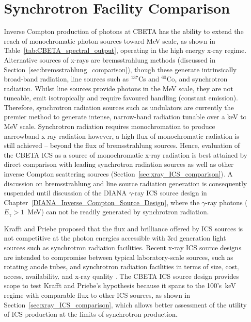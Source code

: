 \documentclass[../main.tex]{subfiles}
\begin{document}
\section{Synchrotron Facility Comparison}
\label{sec:synchrotron_facility_comparison}

Inverse Compton production of photons at CBETA has the ability to extend the reach of monochromatic photon sources toward \si{\mega\electronvolt} scale, as shown in Table~\ref{tab:CBETA_spectral_output}, operating in the high energy x-ray regime. Alternative sources of x-rays are bremsstrahlung methods (discussed in Section~\ref{sec:bremsstrahlung_comparison}), though these generate intrinsically broad-band radiation, line sources such as $^{137}$Cs and $^{60}$Co, and synchrotron radiation. Whilst line sources provide photons in the \si{\mega\electronvolt} scale, they are not tuneable, emit isotropically and require favoured handling (constant emission). Therefore, synchrotron radiation sources such as undulators are currently the premier method to generate intense, narrow-band radiation tunable over a \si{\kilo\electronvolt} to \si{\mega\electronvolt} scale. Synchrotron radiation requires monochromation to produce narrowband x-ray radiation \cite{caciuffo1987monochromators} however, a high flux of monochromatic radiation is still achieved -- beyond the flux of bremsstrahlung sources. Hence, evaluation of the CBETA ICS as a source of monochromatic x-ray radiation is best attained by direct comparison with leading synchrotron radiation sources as well as other inverse Compton scattering sources (Section~\ref{sec:xray_ICS_comparison}). A discussion on bremsstrahlung and line source radiation generation is consequently suspended until discussion of the DIANA $\gamma$-ray ICS source design in Chapter~\ref{DIANA_Inverse_Compton_Source_Design}, where the $\gamma$-ray photons ($E_{\gamma} > 1$~\si{\mega\electronvolt}) can not be readily generated by synchrotron radiation.   

Krafft and Priebe \cite{krafft2010compton} proposed that the flux and brilliance offered by ICS sources is not competitive at the photon energies accessible with 3rd generation light sources such as synchrotron radiation facilities. Recent x-ray ICS source designs are intended to compromise between typical laboratory-scale sources, such as rotating anode tubes, and synchrotron radiation facilities in terms of size, cost, access, availability, and x-ray quality \cite{deitrick2018high}. The CBETA ICS source design provides scope to test Krafft and Priebe's hypothesis because it spans to the 100's~\si{\kilo\electronvolt} regime with comparable flux to other ICS sources, as shown in Section~\ref{sec:xray_ICS_comparison}, which allows better assessment of the utility of ICS production at the limits of synchrotron production.
\end{document}
